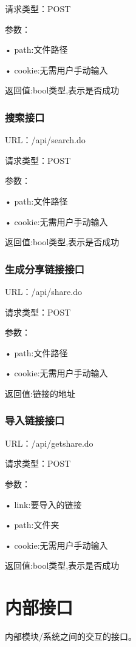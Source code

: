 请求类型：POST

参数： 

• path:文件路径

• cookie:无需用户手动输入

返回值:bool类型,表示是否成功

\subsubsection{搜索接口}
URL：/api/search.do

请求类型：POST

参数： 

• path:文件路径

• cookie:无需用户手动输入

返回值:bool类型,表示是否成功

\subsubsection{生成分享链接接口}
URL：/api/share.do

请求类型：POST

参数： 

• path:文件路径

• cookie:无需用户手动输入

返回值:链接的地址

\subsubsection{导入链接接口}
URL：/api/getshare.do

请求类型：POST

参数： 

• link:要导入的链接

• path:文件夹

• cookie:无需用户手动输入

返回值:bool类型,表示是否成功


\section{内部接口}
内部模块/系统之间的交互的接口。